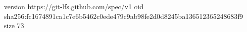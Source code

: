 version https://git-lfs.github.com/spec/v1
oid sha256:fc1674891ca1c7e6b5462c0ede479c9ab98fe2d0d8245ba136512365248683f9
size 73
